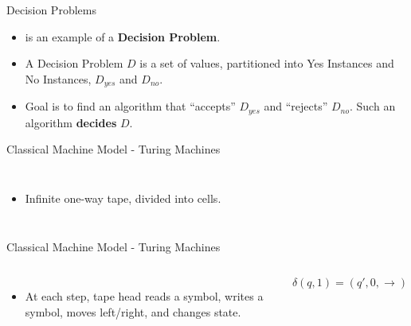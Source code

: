 \documentclass[c]{beamer}
\begin{document}
\begin{frame}{Decision Problems}

  \begin{itemize}
  \item[] \subsum{} is an example of a \textbf{Decision Problem}.\pause

    \vspace{\baselineskip}

  \item[] A Decision Problem $D$ is a set of values, partitioned into
    Yes Instances and No Instances, $D_{yes}$ and $D_{no}$.

  \item[] Goal is to find an algorithm that ``accepts'' $D_{yes}$ and
    ``rejects'' $D_{no}$.  Such an algorithm \textbf{decides} $D$.
  \end{itemize}

\end{frame}

  


\begin{frame}{Classical Machine Model - Turing Machines}
  \begin{columns}

    \begin{itemize}
    \item[] Infinite one-way tape, divided into cells.    
    \end{itemize}
  \end{columns}
\end{frame}

\begin{frame}{Classical Machine Model - Turing Machines}
  \begin{columns}

    \begin{itemize}
    \item At each step, tape head reads a symbol, writes a symbol,
      moves left/right, and changes state.
    \end{itemize}
    
    $$\delta(q, 1) = (q', 0, \rightarrow)$$
  \end{columns}
\end{frame}
\end{document}

